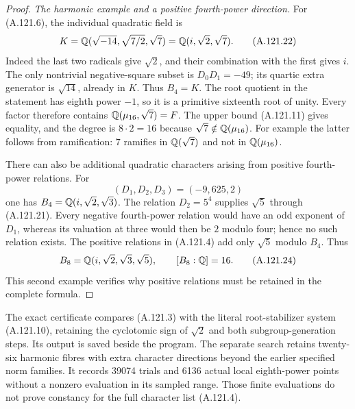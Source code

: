 \begin{proof}
\emph{The harmonic example and a positive fourth-power direction.}
For (A.121.6), the individual quadratic field is
\[
 K=\mathbb Q(\sqrt{-14},\sqrt{7/2},\sqrt7)
       =\mathbb Q(i,\sqrt2,\sqrt7).
\tag{A.121.22}
\]
Indeed the last two radicals give $\sqrt2$, and
their combination with the first gives $i$.
The only nontrivial negative-square subset is
$D_0D_1=-49$; its quartic extra generator is
$\sqrt{14}$, already in $K$.
Thus $B_4=K$.
The root quotient in the statement has eighth power
$-1$, so it is a primitive sixteenth root of unity.
Every factor therefore contains
$\mathbb Q(\mu_{16},\sqrt7)=F$.
The upper bound (A.121.11) gives equality, and the
degree is $8\cdot2=16$ because $\sqrt7\notin\mathbb Q(\mu_{16})$.
For example the latter follows from ramification:
$7$ ramifies in $\mathbb Q(\sqrt7)$ and not in
$\mathbb Q(\mu_{16})$.

There can also be additional quadratic characters
arising from positive fourth-power relations.
For
\[
                   (D_1,D_2,D_3)=(-9,625,2)
\tag{A.121.23}
\]
one has $B_4=\mathbb Q(i,\sqrt2,\sqrt3)$.
The relation $D_2=5^4$ supplies $\sqrt5$ through
(A.121.21).
Every negative fourth-power relation would have an
odd exponent of $D_1$, whereas its valuation at
three would then be $2$ modulo four; hence no such
relation exists.
The positive relations in (A.121.4) add only
$\sqrt5$ modulo $B_4$.
Thus
\[
                  B_8=\mathbb Q(i,\sqrt2,\sqrt3,\sqrt5),
                              \qquad [B_8:\mathbb Q]=16.
\tag{A.121.24}
\]
This second example verifies why positive relations
must be retained in the complete formula.
\end{proof}

The exact certificate
compares (A.121.3) with the literal root-stabilizer
system (A.121.10), retaining the cyclotomic sign
of $\sqrt2$ and both subgroup-generation steps.
Its output is saved beside the program.
The separate search
retains twenty-six harmonic fibres with extra character
directions beyond the earlier specified norm families.
It records 39074 trials and 6136 actual local eighth-power
points without a nonzero evaluation in its sampled range.
Those finite evaluations do not prove constancy for
the full character list (A.121.4).

